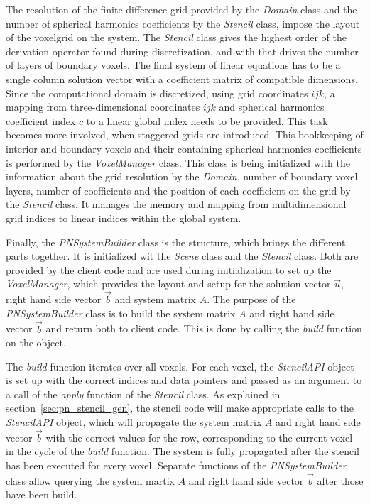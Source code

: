 The resolution of the finite difference grid provided by the \emph{Domain} class and the number of spherical harmonics coefficients by the \emph{Stencil} class, impose the layout of the voxelgrid on the system. The \emph{Stencil} class gives the highest order of the derivation operator found during discretization, and with that drives the number of layers of boundary voxels. The final system of linear equations has to be a single column solution vector with a coefficient matrix of compatible dimensions. Since the computational domain is discretized, using grid coordinates $ijk$, a mapping from three-dimensional coordinates $ijk$ and spherical harmonics coefficient index $c$ to a linear global index needs to be provided. This task becomes more involved, when staggered grids are introduced. This bookkeeping of interior and boundary voxels and their containing spherical harmonics coefficients is performed by the \emph{VoxelManager} class. This class is being initialized with the information about the grid resolution by the \emph{Domain}, number of boundary voxel layers, number of coefficients and the position of each coefficient on the grid by the \emph{Stencil} class. It manages the memory and mapping from multidimensional grid indices to linear indices within the global system.

Finally, the \emph{PNSystemBuilder} class is the structure, which brings the different parts together. It is initialized wit the \emph{Scene} class and the \emph{Stencil} class. Both are provided by the client code and are used during initialization to set up the \emph{VoxelManager}, which provides the layout and setup for the solution vector $\vec{u}$, right hand side vector $\vec{b}$ and system matrix $A$. The purpose of the \emph{PNSystemBuilder} class is to build the system matrix $A$ and right hand side vector $\vec{b}$ and return both to client code. This is done by calling the \emph{build} function on the object.

The \emph{build} function iterates over all voxels. For each voxel, the \emph{StencilAPI} object is set up with the correct indices and data pointers and passed as an argument to a call of the \emph{apply} function of the \emph{Stencil} class. As explained in section~\ref{sec:pn_stencil_gen}, the stencil code will make appropriate calls to the \emph{StencilAPI} object, which will propagate the system matrix $A$ and right hand side vector $\vec{b}$ with the correct values for the row, corresponding to the current voxel in the cycle of the \emph{build} function. The system is fully propagated after the stencil has been executed for every voxel. Separate functions of the \emph{PNSystemBuilder} class allow querying the system martix $A$ and right hand side vector $\vec{b}$ after those have been build.

